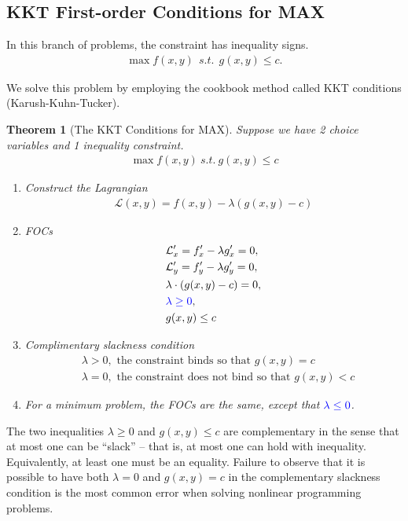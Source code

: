 \documentclass[10pt,a4paper]{book}
\newcommand{\blue}[1]{\textcolor{blue}{#1}}
\newtheorem{theorem}{Theorem}[section]
\theoremstyle{definition}\newtheorem{definition}{Definition}
\theoremstyle{definition}\newtheorem{fact}{Fact}
\theoremstyle{definition}\newtheorem{ex}{Ex.}
\theoremstyle{definition}\newtheorem{project}{Project}
\theoremstyle{definition}\newtheorem{problem}{Problem}
\theoremstyle{definition}\newtheorem{example}{Example}
\numberwithin{theorem}{chapter}
\numberwithin{corollary}{chapter}
\numberwithin{assumption}{chapter}
\numberwithin{definition}{chapter}
\numberwithin{prop}{chapter}
\numberwithin{notation}{chapter}
\numberwithin{problem}{chapter}
\numberwithin{example}{chapter}
\numberwithin{fact}{chapter}
\numberwithin{ex}{chapter}
\newenvironment{ftheorem}
{\begin{mdframed}\begin{theorem}}
		{\end{theorem}\end{mdframed}}
\begin{document}
	\subsection{KKT First-order Conditions for MAX}
	In this branch of problems, the constraint has inequality signs.
	\begin{align*}
		\max f(x,y) \ \ s.t. \ \ g(x,y) \leq c. 
	\end{align*}
	
	We solve this problem by employing the cookbook method called KKT conditions (Karush-Kuhn-Tucker).
	
	\begin{ftheorem}[The KKT Conditions for MAX]
		Suppose we have 2 choice variables and 1 inequality constraint.
		\begin{align*}
			\max f(x,y)  \ s.t. \ g(x,y) \leq c 
		\end{align*}
		\begin{enumerate}
			\item Construct the Lagrangian
			\begin{align*}
				\mathcal{L} (x,y) = f(x,y) - \lambda (g(x,y) - c) 
			\end{align*}
			\item FOCs
			\begin{align*}
				& \mathcal{L}'_x = f'_x - \lambda g'_x = 0, \\
				& \mathcal{L}'_y = f'_y - \lambda g'_y = 0, \\
				& \lambda \cdot ( g(x,y) - c) = 0,                \\
				& \blue{\lambda \geq 0},                    \\
				& g(x,y) \leq c                             
			\end{align*}
			\item Complimentary slackness condition
			\begin{align*}
				& \lambda > 0, \text{ the constraint binds so that $g(x,y) =c$}          \\
				& \lambda = 0, \text{ the constraint does not bind so that $g(x,y) < c$}
			\end{align*}
			\item For a minimum problem, the FOCs are the same, except that $\blue{\lambda \leq 0}$.
		\end{enumerate}
	\end{ftheorem}
	
	The two inequalities $\lambda \geq 0$ and $g(x,y) \leq c$ are complementary in the sense that at most one can be “slack” -- that is, at most one can hold with inequality. Equivalently, at least one must be an equality. Failure to observe that it is possible to have both $\lambda=0$ and $g(x,y)=c$ in the complementary slackness condition is the most common error when solving nonlinear programming problems.
	
\end{document}
